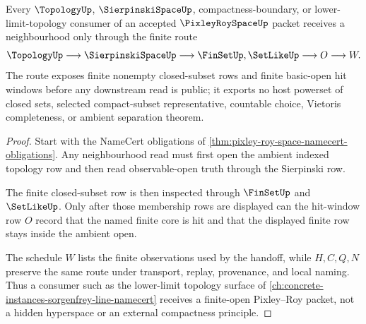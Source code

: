 \begin{theorem}
\label{thm:pixley-roy-finite-open-handoff}
Every $\TopologyUp$, $\SierpinskiSpaceUp$, compactness-boundary, or lower-limit-topology consumer of an accepted $\PixleyRoySpaceUp$ packet receives a neighbourhood only through the finite route
$$
\TopologyUp \longrightarrow \SierpinskiSpaceUp \longrightarrow \FinSetUp,\SetLikeUp \longrightarrow O \longrightarrow W .
$$
The route exposes finite nonempty closed-subset rows and finite basic-open hit windows before any downstream read is public; it exports no host powerset of closed sets, selected compact-subset representative, countable choice, Vietoris completeness, or ambient separation theorem.
\end{theorem}
\begin{proof}
Start with the NameCert obligations of \autoref{thm:pixley-roy-space-namecert-obligations}. Any neighbourhood read must first open the ambient indexed topology row and then read observable-open truth through the Sierpinski row.

The finite closed-subset row is then inspected through $\FinSetUp$ and $\SetLikeUp$. Only after those membership rows are displayed can the hit-window row $O$ record that the named finite core is hit and that the displayed finite row stays inside the ambient open.

The schedule $W$ lists the finite observations used by the handoff, while $H,C,Q,N$ preserve the same route under transport, replay, provenance, and local naming. Thus a consumer such as the lower-limit topology surface of \autoref{ch:concrete-instances-sorgenfrey-line-namecert} receives a finite-open Pixley--Roy packet, not a hidden hyperspace or an external compactness principle.
\end{proof}


\begin{closurestatus}{\PixleyRoySpaceUp}
  \theoryclosure{\seedClosure}
  \formalstatus{\unformalizedV}
\end{closurestatus}
